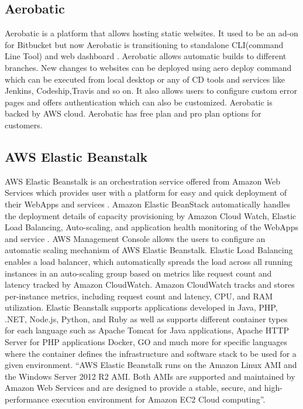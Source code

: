    \pv

\subsection{Aerobatic}

    Aerobatic is a platform that allows
    hosting static websites\cite{www-aero}. It used to be an ad-on for
    Bitbucket but
    now Aerobatic is transitioning to standalone CLI(command Line
    Tool) and web dashboard . Aerobatic allows automatic builds to
    different branches. New changes to websites can be deployed using
    aero deploy command which can be executed from local desktop or
    any of CD tools and services like Jenkins, Codeship,Travis and so
    on.  It also allows users to configure custom error pages and
    offers authentication which can also be customized. Aerobatic is
    backed by AWS cloud. Aerobatic has free plan and pro plan options
    for customers.

    \pv

\subsection{AWS Elastic Beanstalk}

    AWS Elastic Beanstalk is an orchestration service offered from
    Amazon Web Services which provides user with a platform for easy
    and quick deployment of their WebApps and services
    \cite{www-amazon-elastic-beanstalk}. Amazon Elastic BeanStack
    automatically handles the deployment details of capacity
    provisioning by Amazon Cloud Watch, Elastic Load Balancing,
    Auto-scaling, and application health monitoring of the WebApps and
    service \cite{amazon-elastic-beanstalk-book}. AWS Management
    Console allows the users to configure an automatic scaling
    mechanism of AWS Elastic Beanstalk. Elastic Load Balancing enables
    a load balancer, which automatically spreads the load across all
    running instances in an auto-scaling group based on metrics like
    request count and latency tracked by Amazon CloudWatch. Amazon
    CloudWatch tracks and stores per-instance metrics, including
    request count and latency, CPU, and RAM utilization. Elastic
    Beanstalk supports applications developed in Java, PHP, .NET,
    Node.js, Python, and Ruby as well as supports different container
    types for each language such as Apache Tomcat for Java
    applications, Apache HTTP Server for PHP applications Docker, GO
    and much more for specific languages where the container defines
    the infrastructure and software stack to be used for a given
    environment. ``AWS Elastic Beanstalk runs on the Amazon Linux AMI
    and the Windows Server 2012 R2 AMI. Both AMIs are supported and
    maintained by Amazon Web Services and are designed to provide a
    stable, secure, and high-performance execution environment for
    Amazon EC2 Cloud computing''\cite{www-amazon-elastic-beanstalk}.

